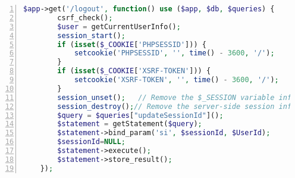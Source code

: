 \begin{minipage}{\linewidth}
\begin{lstlisting}[language=PHP, label={lst:logoutbug}, numbers=left, caption=Logout Bug]
    $app->get('/logout', function() use ($app, $db, $queries) {
        csrf_check();
        $user = getCurrentUserInfo();
        session_start();
        if (isset($_COOKIE['PHPSESSID'])) {
            setcookie('PHPSESSID', '', time() - 3600, '/');
        }
        if (isset($_COOKIE['XSRF-TOKEN'])) {
            setcookie('XSRF-TOKEN', '', time() - 3600, '/');
        }
        session_unset();   // Remove the $_SESSION variable information.
        session_destroy();// Remove the server-side session information.
        $query = $queries["updateSessionId"]();
        $statement = getStatement($query);
        $statement->bind_param('si', $sessionId, $UserId);
        $sessionId=NULL;
        $statement->execute();
        $statement->store_result();
    });
\end{lstlisting}
\end{minipage}



\clearpage
